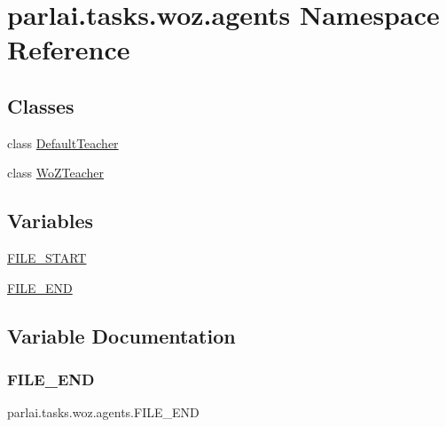 \hypertarget{namespaceparlai_1_1tasks_1_1woz_1_1agents}{}\section{parlai.\+tasks.\+woz.\+agents Namespace Reference}
\label{namespaceparlai_1_1tasks_1_1woz_1_1agents}
\subsection*{Classes}
\begin{DoxyCompactItemize}
\item 
class \hyperlink{classparlai_1_1tasks_1_1woz_1_1agents_1_1DefaultTeacher}{Default\+Teacher}
\item 
class \hyperlink{classparlai_1_1tasks_1_1woz_1_1agents_1_1WoZTeacher}{Wo\+Z\+Teacher}
\end{DoxyCompactItemize}
\subsection*{Variables}
\begin{DoxyCompactItemize}
\item 
\hyperlink{namespaceparlai_1_1tasks_1_1woz_1_1agents_a16ed68eb87c3c1f00dfe215c5fdc4d37}{F\+I\+L\+E\+\_\+\+S\+T\+A\+RT}
\item 
\hyperlink{namespaceparlai_1_1tasks_1_1woz_1_1agents_a011770c37d4d0ce5580ff1f69ed43058}{F\+I\+L\+E\+\_\+\+E\+ND}
\end{DoxyCompactItemize}


\subsection{Variable Documentation}
\mbox{\label{namespaceparlai_1_1tasks_1_1woz_1_1agents_a011770c37d4d0ce5580ff1f69ed43058}} 
\subsubsection{\texorpdfstring{F\+I\+L\+E\+\_\+\+E\+ND}{FILE\_END}}
{\footnotesize\ttfamily parlai.\+tasks.\+woz.\+agents.\+F\+I\+L\+E\+\_\+\+E\+ND}



